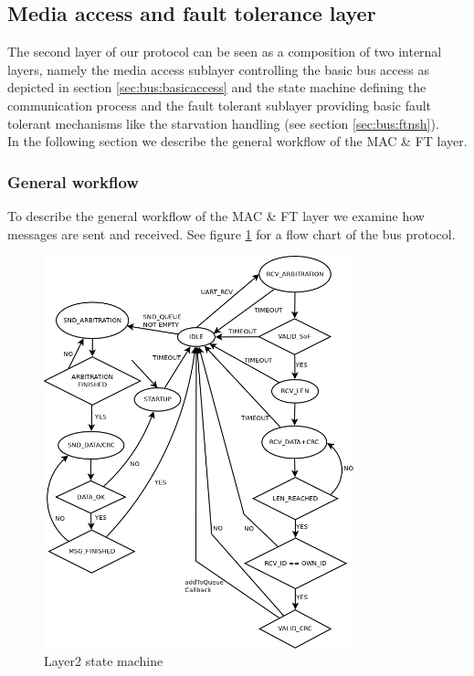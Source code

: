 \subsection{Media access and fault tolerance layer}
\label{sec:bus:design:layer2}

The second layer of our protocol can be seen as a composition of two internal layers, 
namely the media access sublayer controlling the basic bus access as depicted in section 
\ref{sec:bus:basicaccess}  and the state machine defining 
the communication process and the fault tolerant sublayer providing basic fault 
tolerant mechanisms like the starvation handling (see section \ref{sec:bus:ftnsh}).\\

In the following section we describe the general workflow of the MAC \& FT layer.

\subsubsection{General workflow}
To describe the general workflow of the MAC \& FT layer we examine how messages are sent and received. 
See figure \ref{fig:bus:design:layer2:statemachine} for a flow chart of the bus protocol.\\

\begin{figure}[H]
\centering
\includegraphics[width=0.8\textwidth]{../images/layer2_state_machine.png}
\caption{Layer2 state machine}
\label{fig:bus:design:layer2:statemachine}
\end{figure}

